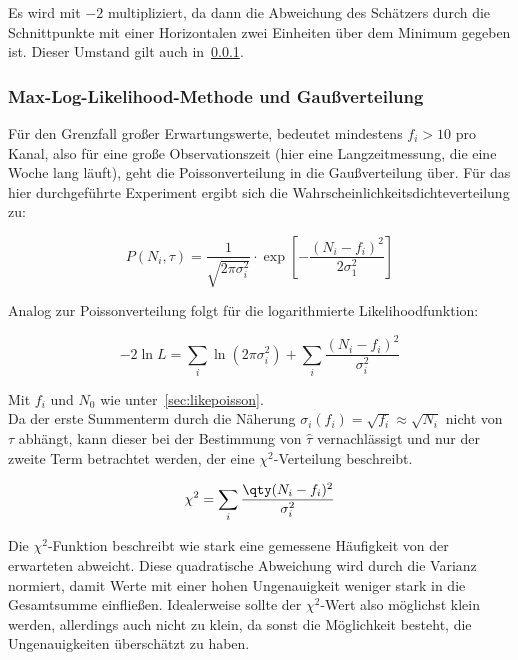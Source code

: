 \documentclass[slug=LM, room=Andreas-Schubert-Bau\,\ K\ 1A, supervisor=Anne-Sophie\ Berthold, coursedate=13.\ 12.\ 2019]{../../Lab_Report_LaTeX/lab_report}
\begin{document}
Es wird mit \(-2\) multipliziert, da dann die Abweichung des
Sch\"atzers durch die Schnittpunkte mit einer Horizontalen zwei
Einheiten \"uber dem Minimum gegeben ist\cite{Barlow}. Dieser Umstand
gilt auch in~\ref{sec:likegauss}.

\subsubsection{Max-Log-Likelihood-Methode und Gaußverteilung}
\label{sec:likegauss}

Für den Grenzfall großer Erwartungswerte, bedeutet mindestens \(f_i > 10\) pro Kanal, also für
eine große Observationszeit (hier eine Langzeitmessung, die eine Woche lang läuft), geht die
Poissonverteilung in die Gaußverteilung über. Für das hier durchgeführte Experiment ergibt sich
die Wahrscheinlichkeitsdichteverteilung zu:

\begin{equation}\label{eq:wahrgauss}
 P(N_i,\tau) = \frac{1}{\sqrt{2\pi \sigma_i^2}} \cdot \exp[-\frac{(N_i-f_i)^2}{2\sigma_1^2}]
\end{equation}

Analog zur Poissonverteilung folgt für die logarithmierte Likelihoodfunktion:

\begin{equation}\label{key}
 -2\ln L = \sum_{i}\ln (2\pi\sigma_i^2) + \sum_{i} \frac{(N_i - f_i)^2}{\sigma_i^2}
\end{equation}

Mit \(f_i\) und \(N_0\) wie unter~\ref{sec:likepoisson}. \\

Da der erste Summenterm durch die Näherung \(\sigma_i(f_i) = \sqrt{f_i} \approx \sqrt{N_i}\) nicht
von \(\tau\) abhängt, kann dieser bei der Bestimmung von \(\hat{\tau}\) vernachlässigt und nur
der zweite Term betrachtet werden, der eine \(\chi^2\)-Verteilung beschreibt.

\begin{equation}\label{eq:chi}
 \chi^2 = \sum_{i} \frac{\qty(N_i - f_i)^2}{\sigma_i^2}
\end{equation}

Die \(\chi^2\)-Funktion beschreibt wie stark eine gemessene Häufigkeit von der erwarteten abweicht.
Diese quadratische Abweichung wird durch die Varianz normiert, damit Werte mit einer hohen
Ungenauigkeit weniger stark in die Gesamtsumme einfließen. Idealerweise sollte der \(\chi^2\)-Wert
also möglichst klein werden, allerdings auch nicht zu klein, da sonst die Möglichkeit besteht, die
Ungenauigkeiten überschätzt zu haben.\\
\end{document}

